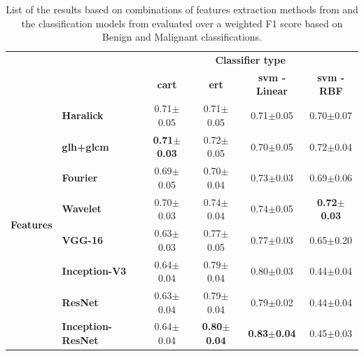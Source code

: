 \documentclass[journal,article,submit,moreauthors,pdftex, applsci]{Definitions/mdpi}
\begin{document}
\begin{table}[h]
    \centering
    \begin{tabular}{llcccc}
    \multicolumn{2}{c}{}                                                &\multicolumn{4}{c}{\textbf{Classifier type}}                                                       \\ \cline{3-6}
    \multicolumn{2}{c}{}                                                &\textbf{\ac{cart}}     &\textbf{\ac{ert}}      &\textbf{\ac{svm} - Linear} &\textbf{\ac{svm} - RBF}\\ \hline
    \multirow{8}{*}{\textbf{Features}}  &\textbf{Haralick}              &0.71$\pm$0.05          &0.71$\pm$0.05          &0.71$\pm$0.05              &0.70$\pm$0.07          \\ \cline{2-6} 
                                        &\textbf{\ac{glh}+\ac{glcm}}    &\textbf{0.71$\pm$0.03} &0.72$\pm$0.05          &0.70$\pm$0.05              &0.72$\pm$0.04          \\ \cline{2-6} 
                                        &\textbf{Fourier}               &0.69$\pm$0.05          &0.70$\pm$0.04          &0.73$\pm$0.03              &0.69$\pm$0.06          \\ \cline{2-6} 
                                        &\textbf{Wavelet}               &0.70$\pm$0.03          &0.74$\pm$0.04          &0.74$\pm$0.05              &\textbf{0.72$\pm$0.03} \\ \cline{2-6} 
                                        &\textbf{VGG-16}                &0.63$\pm$0.03          &0.77$\pm$0.05          &0.77$\pm$0.03              &0.65$\pm$0.20          \\ \cline{2-6} 
                                        &\textbf{Inception-V3}          &0.64$\pm$0.04          &0.79$\pm$0.04          &0.80$\pm$0.03              &0.44$\pm$0.04          \\ \cline{2-6} 
                                        &\textbf{ResNet}                &0.63$\pm$0.04          &0.79$\pm$0.04          &0.79$\pm$0.02              &0.44$\pm$0.04          \\ \cline{2-6} 
                                        &\textbf{Inception-ResNet}      &0.64$\pm$0.04          &\textbf{0.80$\pm$0.04} &\textbf{0.83$\pm$0.04}     &0.45$\pm$0.03          \\ \hline 
    \end{tabular}    
    \caption{List of the results based on combinations of features extraction methods from  and the classification models from  evaluated over a weighted F1 score based on Benign and Malignant classifications.}
    \label{tab:image_results}
\end{table}
\end{document}
